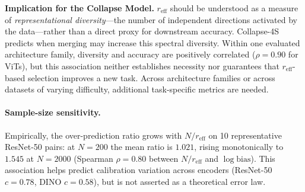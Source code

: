 \documentclass{article}
\newcommand{\reff}{\ensuremath{r_{\mathrm{eff}}}\xspace}
\begin{document}
\textbf{Implication for the Collapse Model.}
$\reff$ should be understood as a measure of
\emph{representational diversity}---the number of independent directions
activated by the data---rather than a direct proxy for downstream accuracy.
Collapse-4S predicts when merging may increase this spectral diversity.
Within one evaluated architecture family, diversity and accuracy are
positively correlated ($\rho{=}0.90$ for ViTs), but this association neither
establishes necessity nor guarantees that $\reff$-based selection improves a
new task.
Across architecture families or across datasets of varying difficulty,
additional task-specific metrics are needed.


\paragraph{Sample-size sensitivity.}
Empirically, the over-prediction ratio grows with $N/\reff$ on 10
representative ResNet-50 pairs:
at $N{=}200$ the mean ratio is $1.021$, rising monotonically to $1.545$ at $N{=}2000$
(Spearman $\rho{=}0.80$ between $N/\reff$ and $\log\mathrm{bias}$).
This association helps predict calibration variation across encoders
(ResNet-50 $c{=}0.78$, DINO $c{=}0.58$), but is not asserted as a
theoretical error law.


\newpage

\end{document}

